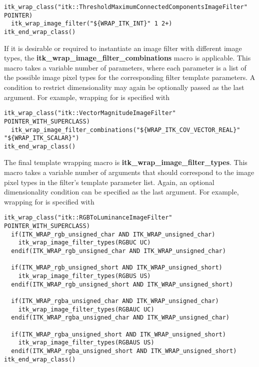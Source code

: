 \begin{verbatim}
itk_wrap_class("itk::ThresholdMaximumConnectedComponentsImageFilter" POINTER)
  itk_wrap_image_filter("${WRAP_ITK_INT}" 1 2+)
itk_end_wrap_class()
\end{verbatim}

If it is desirable or required to instantiate an image filter with different
image types, the \textbf{itk\_wrap\_image\_filter\_combinations} macro is
applicable. This macro takes a variable number of parameters, where each
parameter is a list of the possible image pixel types for the corresponding
filter
template parameters. A condition to restrict dimensionality may again be
optionally passed as the last argument. For example, wrapping for
 is specified with

\begin{verbatim}
itk_wrap_class("itk::VectorMagnitudeImageFilter" POINTER_WITH_SUPERCLASS)
  itk_wrap_image_filter_combinations("${WRAP_ITK_COV_VECTOR_REAL}" "${WRAP_ITK_SCALAR}")
itk_end_wrap_class()
\end{verbatim}

The final template wrapping macro is \textbf{itk\_wrap\_image\_filter\_types}.
This macro takes a variable number of arguments that should correspond to the
image pixel types in the filter's template parameter list. Again, an optional
dimensionality condition can be specified as the last argument. For example,
wrapping for  is specified with

\begin{verbatim}
itk_wrap_class("itk::RGBToLuminanceImageFilter" POINTER_WITH_SUPERCLASS)
  if(ITK_WRAP_rgb_unsigned_char AND ITK_WRAP_unsigned_char)
    itk_wrap_image_filter_types(RGBUC UC)
  endif(ITK_WRAP_rgb_unsigned_char AND ITK_WRAP_unsigned_char)

  if(ITK_WRAP_rgb_unsigned_short AND ITK_WRAP_unsigned_short)
    itk_wrap_image_filter_types(RGBUS US)
  endif(ITK_WRAP_rgb_unsigned_short AND ITK_WRAP_unsigned_short)

  if(ITK_WRAP_rgba_unsigned_char AND ITK_WRAP_unsigned_char)
    itk_wrap_image_filter_types(RGBAUC UC)
  endif(ITK_WRAP_rgba_unsigned_char AND ITK_WRAP_unsigned_char)

  if(ITK_WRAP_rgba_unsigned_short AND ITK_WRAP_unsigned_short)
    itk_wrap_image_filter_types(RGBAUS US)
  endif(ITK_WRAP_rgba_unsigned_short AND ITK_WRAP_unsigned_short)
itk_end_wrap_class()
\end{verbatim}


